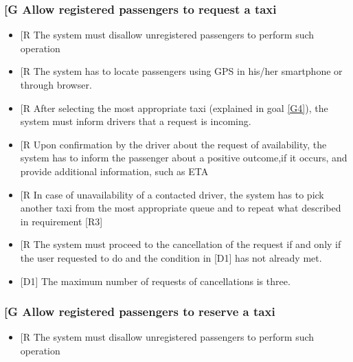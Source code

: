 \documentclass[a4paper,12pt]{article}%
\newcounter{goals_counter}
\newcounter{func_req_counter}
\begin{document}
\subsubsection{\label{goal\arabic{goals_counter}}{[}G\arabic{goals_counter}{]} Allow registered passengers to request a taxi}
\begin{itemize}
\item {[}R\arabic{func_req_counter}{]} The system must disallow unregistered passengers to perform such operation
\item {[}R\arabic{func_req_counter}{]} The system has to locate passengers using GPS in his/her smartphone or through browser.
\item {[}R\arabic{func_req_counter}{]} After selecting the most appropriate taxi (explained in goal \hyperref[goal4]{[G4]}), the system must inform drivers that a request is incoming.
\item {[}R\arabic{func_req_counter}{]} Upon confirmation by the driver about the request of availability, the system has to inform the passenger about a positive outcome,if it occurs, and provide additional information, such as ETA
\item {[}R\arabic{func_req_counter}{]} In case of unavailability of a contacted driver, the system has to pick another taxi from the most appropriate queue and to repeat what described in requirement [R3]
\item {[}R\arabic{func_req_counter}{]} The system must proceed to the cancellation of the request if and only if the user requested to do and the condition in [D1] has not already met.
\item {[}D1{]} The maximum number of requests of cancellations is three.
\end{itemize}
\setcounter{func_req_counter}{1}
\subsubsection{\label{goal\arabic{goals_counter}}{[}G\arabic{goals_counter}{]} Allow registered passengers to reserve a taxi}
\begin{itemize}
\item {[}R\arabic{func_req_counter}{]} The system must disallow unregistered passengers to perform such operation
\end{itemize}
\end{document}
